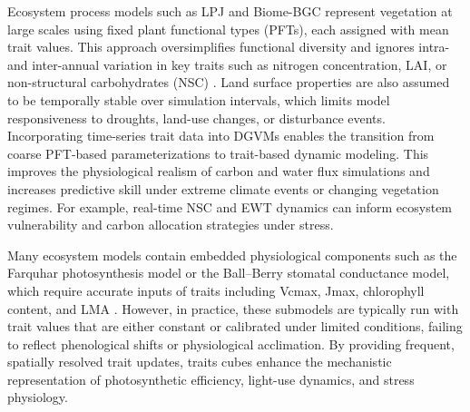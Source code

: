\documentclass[pdflatex,sn-mathphys-num]{sn-jnl}%
\theoremstyle{thmstyleone}%
\theoremstyle{thmstyletwo}%
\theoremstyle{thmstylethree}%
\begin{document}
Ecosystem process models such as LPJ and Biome-BGC represent vegetation at large scales using fixed plant functional types (PFTs), each assigned with mean trait values. This approach oversimplifies functional diversity and ignores intra- and inter-annual variation in key traits such as nitrogen concentration, LAI, or non-structural carbohydrates (NSC) \cite{verrelst2019quantifying,mederer2025plant}. Land surface properties are also assumed to be temporally stable over simulation intervals, which limits model responsiveness to droughts, land-use changes, or disturbance events. Incorporating time-series trait data into DGVMs enables the transition from coarse PFT-based parameterizations to trait-based dynamic modeling. This improves the physiological realism of carbon and water flux simulations and increases predictive skill under extreme climate events or changing vegetation regimes. For example, real-time NSC and EWT dynamics can inform ecosystem vulnerability and carbon allocation strategies under stress.

Many ecosystem models contain embedded physiological components such as the Farquhar photosynthesis model or the Ball–Berry stomatal conductance model, which require accurate inputs of traits including Vcmax, Jmax, chlorophyll content, and LMA \cite{sun5107112bridging,ali2021machine}. However, in practice, these submodels are typically run with trait values that are either constant or calibrated under limited conditions, failing to reflect phenological shifts or physiological acclimation. By providing frequent, spatially resolved trait updates, traits cubes enhance the mechanistic representation of photosynthetic efficiency, light-use dynamics, and stress physiology. %
\end{document}

